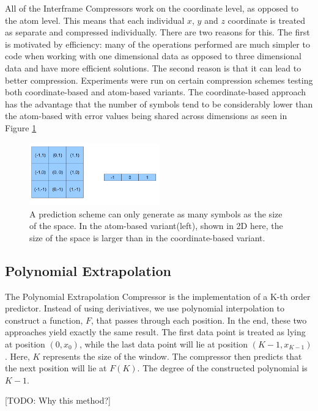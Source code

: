 \documentclass[a4paper,11pt]{report}
\begin{document}
All of the Interframe Compressors work on the coordinate level, as opposed to the atom level. This means that each individual $x$, $y$ and $z$ coordinate is treated as separate and compressed individually. There are two reasons for this. The first is motivated by efficiency: many of the operations performed are much simpler to code when working with one dimensional data as opposed to three dimensional data and have more efficient solutions. The second reason is that it can lead to better compression. Experiments were run on certain compression schemes testing both coordinate-based and atom-based variants. The coordinate-based approach has the advantage that the number of symbols tend to be considerably lower than the atom-based with error values being shared across dimensions as seen in Figure \ref{High}

\begin{figure}
 \center
 \includegraphics[width=0.5\textwidth]{resources/HigherSymbols.png}
\caption{A prediction scheme can only generate as many symbols as the size of the space. In the atom-based variant(left), shown in 2D here, the size of the space is larger than in the coordinate-based variant. }
\label{High}
\end{figure}

\subsection{Polynomial Extrapolation}

The Polynomial Extrapolation Compressor is the implementation of a K-th order predictor. Instead of using deriviatives, we use polynomial interpolation to construct a function, $F$, that passes through each position. In the end, these two approaches yield exactly the same result. The first data point is treated as lying at position $(0, x_0)$, while the last data point will lie at position $(K-1, x_{K-1})$. Here, $K$ represents the size of the window.  The compressor then predicts that the next position will lie at $F(K)$. The degree of the constructed polynomial is $K-1$.

[TODO: Why this method?]
\end{document}
